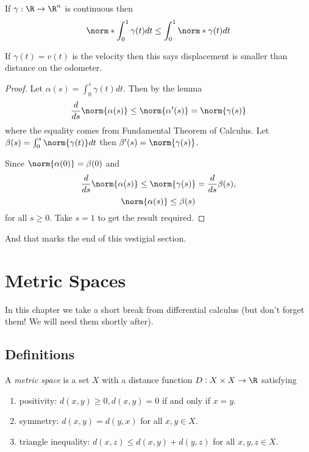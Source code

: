 \documentclass[a4paper]{article}
\theoremstyle{definition}
\begin{document}
\begin{corollary}
  \label{cor:distance and displacement}
  If \(\gamma: \R \to \R^n\) is continuous then
  \[
    \norm*{\int_{0}^{1} \gamma(t) dt} \leq \int_{0}^{1} \norm*{\gamma(t)} dt
  \]
\end{corollary}

\begin{note}
  If \(\gamma(t) = v(t)\) is the velocity then this says displacement is smaller than distance on the odometer.
\end{note}

\begin{proof}
  Let \(\alpha(s) = \int_{0}^{s} \gamma(t) dt\). Then by the lemma
  \[
    \frac{d}{ds} \norm{\alpha(s)} \leq \norm{\alpha'(s)} = \norm{\gamma(s)}
  \]
  where the equality comes from Fundamental Theorem of Calculus. Let \(\beta(s) = \int_{0}^{s} \norm{\gamma(t)} dt\) then \(\beta'(s) = \norm{\gamma(s)}\).

  Since \(\norm{\alpha(0)} = \beta(0)\) and
  \[
    \frac{d}{ds} \norm{\alpha(s)} \leq \norm{\gamma(s)} = \frac{d}{ds} \beta(s),
  \]
  \[
    \norm{\alpha(s)} \leq \beta(s)
  \]
  for all \(s \geq 0\). Take \(s = 1\) to get the result required.
\end{proof}

And that marks the end of this vestigial section.

\section{Metric Spaces}

In this chapter we take a short break from differential calculus (but don't forget them! We will need them shortly after).

\subsection{Definitions}

\begin{definition}
  A \emph{metric space} is a set \(X\) with a distance function \(D: X \times X \to \R\) satisfying
  \begin{enumerate}
  \item positivity: \(d(x, y) \geq 0, d(x, y) = 0\) if and only if \(x = y\).
  \item symmetry: \(d(x, y) = d(y, x)\) for all \(x, y \in X\).
  \item triangle inequality: \(d(x, z) \leq d(x, y) + d(y, z)\) for all \(x, y, z \in X\).
  \end{enumerate}
\end{definition}
\end{document}
